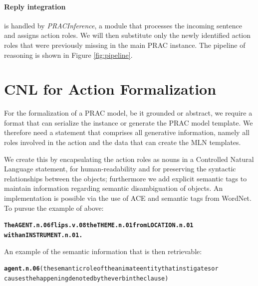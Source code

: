 \documentclass[oribibl]{llncs}
\begin{document}



\paragraph{Reply integration} is handled by \textit{PRACInference}, 
a module that processes the incoming sentence and assigns action 
roles. We will then substitute only the newly identified action 
roles that were previously missing in the main PRAC instance. The pipeline
of reasoning is shown in Figure \ref{fig:pipeline}.

\section{CNL for Action Formalization}
For the formalization of a PRAC model, be it grounded or abstract, we require a format that can serialize the instance or generate the PRAC model template.
We therefore need a statement that comprises all generative information, namely all roles involved in the action and the data that can create the MLN templates.  

We create this by encapsulating the action roles as nouns in a Controlled Natural Language statement, for human-readability and for preserving the syntactic relationships between the objects; furthermore we add explicit semantic tags to maintain information regarding semantic disambiguation of objects.
An implementation is possible via the use of ACE and semantic tags from WordNet\cite{Miller95wordnet:a}. To pursue the example of above:
\begin{alltt}
\textbf{The AGENT.n.06 flips.v.08 the THEME.n.01 from LOCATION.n.01 \\with an INSTRUMENT.n.01.}
\end{alltt}
An example of the semantic information that is then retrievable:
{\small
\begin{alltt}
\textbf{agent.n.06} {\color{red}(the semantic role of the animate entity that instigates or 
causes the happening denoted by the verb in the clause)}
\end{alltt}}
\end{document}
